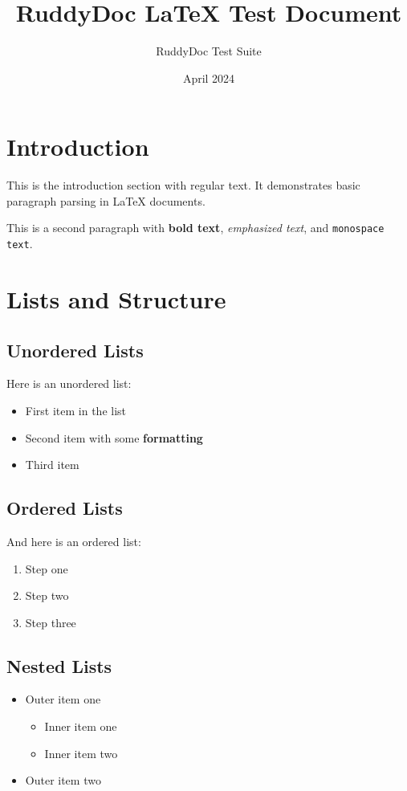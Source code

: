\documentclass{article}
\title{RuddyDoc LaTeX Test Document}
\author{RuddyDoc Test Suite}
\date{April 2024}
\begin{document}
\maketitle

\section{Introduction}

This is the introduction section with regular text. It demonstrates basic paragraph parsing in \LaTeX{} documents.

This is a second paragraph with \textbf{bold text}, \emph{emphasized text}, and \texttt{monospace text}.

\section{Lists and Structure}

\subsection{Unordered Lists}

Here is an unordered list:

\begin{itemize}
    \item First item in the list
    \item Second item with some \textbf{formatting}
    \item Third item
\end{itemize}

\subsection{Ordered Lists}

And here is an ordered list:

\begin{enumerate}
    \item Step one
    \item Step two
    \item Step three
\end{enumerate}

\subsection{Nested Lists}

\begin{itemize}
    \item Outer item one
    \begin{itemize}
        \item Inner item one
        \item Inner item two
    \end{itemize}
    \item Outer item two
\end{itemize}
\end{document}
